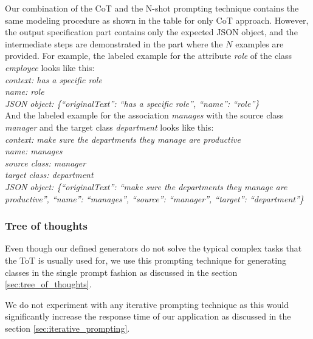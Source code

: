 Our combination of the CoT and the N-shot prompting technique contains the same modeling procedure as shown in the table for only CoT approach. However, the output specification part contains only the expected JSON object, and the intermediate steps are demonstrated in the part where the $N$ examples are provided. For example, the labeled example for the attribute \textit{role} of the class \textit{employee} looks like this: \\

\noindent{}\textit{context: has a specific role} \\
\textit{name: role} \\
\textit{JSON object: \{``originalText'': ``has a specific role'', ``name'': ``role''\}} \\

\noindent{}And the labeled example for the association \textit{manages} with the source class \textit{manager} and the target class \textit{department} looks like this: \\

\noindent{}\textit{context: make sure the departments they manage are productive} \\
\textit{name: manages} \\
\textit{source class: manager} \\
\textit{target class: department} \\
\textit{JSON object: \{``originalText'': ``make sure the departments they manage are productive'', ``name'': ``manages'', ``source'': ``manager'', ``target'': ``department''\}}


\subsubsection{Tree of thoughts}

Even though our defined generators do not solve the typical complex tasks that the ToT is usually used for, we use this prompting technique for generating classes in the single prompt fashion as discussed in the section \ref{sec:tree_of_thoughts}.

We do not experiment with any iterative prompting technique as this would significantly increase the response time of our application as discussed in the section \ref{sec:iterative_prompting}.



